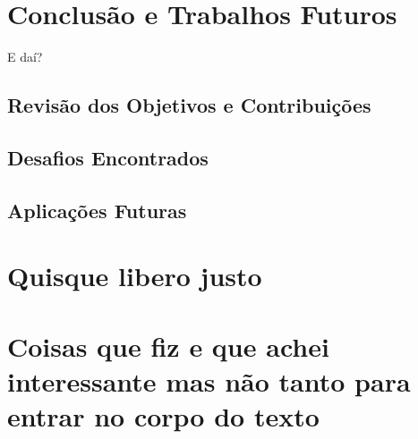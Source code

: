 \documentclass[12pt, %
openright, 
oneside, %
a4paper,    %
brazil]{facom-ufu-abntex2}
\begin{document}

\chapter{Conclusão e Trabalhos Futuros}
E daí?
\section{Revisão dos Objetivos e Contribuições}
\section{Desafios Encontrados}
\section{Aplicações Futuras}





\postextual






\begin{apendicesenv}

\partapendices

\chapter{Quisque libero justo}

\lipsum[50]

\chapter{Coisas que fiz e que achei interessante mas não tanto para entrar no corpo do texto}
\lipsum[55-57]

\end{apendicesenv}
\end{document}
